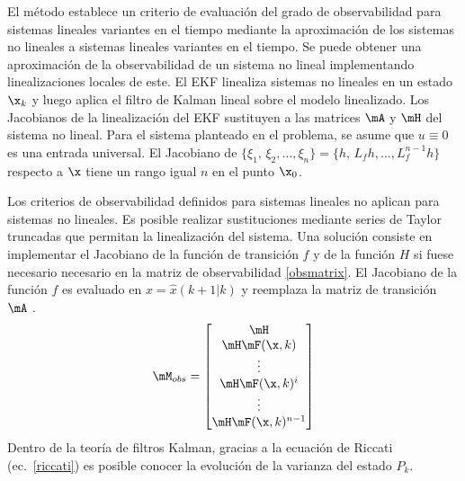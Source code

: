 El método establece un criterio de evaluación del grado de observabilidad para sistemas lineales variantes en el tiempo mediante la aproximación de los sistemas no lineales a sistemas lineales variantes en el tiempo.
Se puede obtener una aproximación de la observabilidad de un sistema no lineal implementando linealizaciones locales de este.
El EKF linealiza sistemas no lineales en un estado $\x_k$ y luego aplica el filtro de Kalman lineal sobre el modelo linealizado.
Los Jacobianos de la linealización del EKF sustituyen a las matrices $\mA$ y $\mH$ del sistema no lineal.
Para el sistema planteado en el problema, se asume que $u\equiv0$ es una entrada universal.
El Jacobiano de $\{\xi_1,\,\xi_2,\ldots,\xi_n \} = \{h,\,L_fh,\ldots,L_f^{n-1}h\}$ respecto a $\x$ tiene un rango igual $n$ en el punto $\x_0$.\par
Los criterios de observabilidad definidos para sistemas lineales no aplican para sistemas no lineales.
Es posible realizar sustituciones mediante series de Taylor truncadas que permitan la linealización del sistema.
Una solución consiste en implementar el Jacobiano de la función de transición $f$ y de la función $H$ si fuese necesario necesario en la matriz de observabilidad \ref{obsmatrix}.
El Jacobiano de la función $f$ es evaluado en $x=\hat{x}(k+1|k)$ y reemplaza la matriz de transición $\mA$ \cite{Southall1998}.
\begin{equation}
	\mM_{obs}=
	\begin{bmatrix} 
	\mH\\
	\mH \mF(\x,k)\\
	\vdots\\
	\mH \mF(\x,k)^i\\
	\vdots\\
	\mH \mF(\x,k)^{n-1}
	\end{bmatrix}
\end{equation}
Dentro de la teoría de filtros Kalman, gracias a la ecuación de Riccati (ec.~\ref{riccati}) es posible conocer la evolución de la varianza del estado $P_k$.

